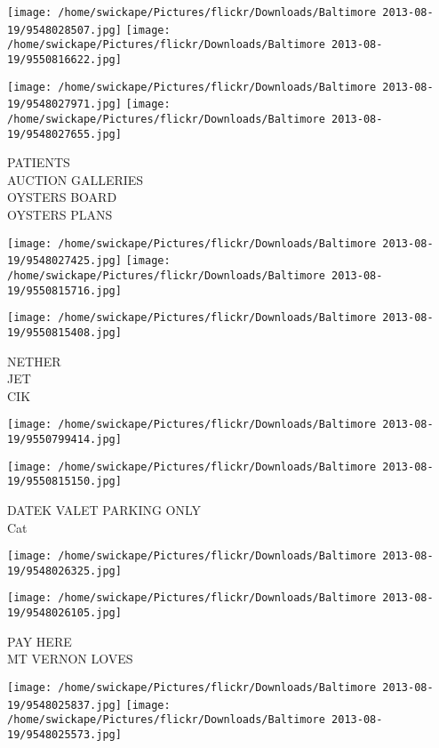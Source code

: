 \documentclass[10pt,letterpaper]{article}
\begin{document}
\texttt{[image: /home/swickape/Pictures/flickr/Downloads/Baltimore 2013-08-19/9548028507.jpg]}
\texttt{[image: /home/swickape/Pictures/flickr/Downloads/Baltimore 2013-08-19/9550816622.jpg]}

\texttt{[image: /home/swickape/Pictures/flickr/Downloads/Baltimore 2013-08-19/9548027971.jpg]}
\texttt{[image: /home/swickape/Pictures/flickr/Downloads/Baltimore 2013-08-19/9548027655.jpg]}

PATIENTS\\
AUCTION GALLERIES\\
OYSTERS BOARD\\
OYSTERS PLANS\\
\pagebreak

\texttt{[image: /home/swickape/Pictures/flickr/Downloads/Baltimore 2013-08-19/9548027425.jpg]}
\texttt{[image: /home/swickape/Pictures/flickr/Downloads/Baltimore 2013-08-19/9550815716.jpg]}

\texttt{[image: /home/swickape/Pictures/flickr/Downloads/Baltimore 2013-08-19/9550815408.jpg]}

NETHER\\
JET\\
CIK\\
\pagebreak

\texttt{[image: /home/swickape/Pictures/flickr/Downloads/Baltimore 2013-08-19/9550799414.jpg]}

\vspace{0.25in}
\texttt{[image: /home/swickape/Pictures/flickr/Downloads/Baltimore 2013-08-19/9550815150.jpg]}

DATEK VALET PARKING ONLY\\
Cat\\
\pagebreak

\texttt{[image: /home/swickape/Pictures/flickr/Downloads/Baltimore 2013-08-19/9548026325.jpg]}

\vspace{0.25in}
\texttt{[image: /home/swickape/Pictures/flickr/Downloads/Baltimore 2013-08-19/9548026105.jpg]}

PAY HERE\\
MT VERNON LOVES\\
\pagebreak

\texttt{[image: /home/swickape/Pictures/flickr/Downloads/Baltimore 2013-08-19/9548025837.jpg]}
\texttt{[image: /home/swickape/Pictures/flickr/Downloads/Baltimore 2013-08-19/9548025573.jpg]}
\end{document}

